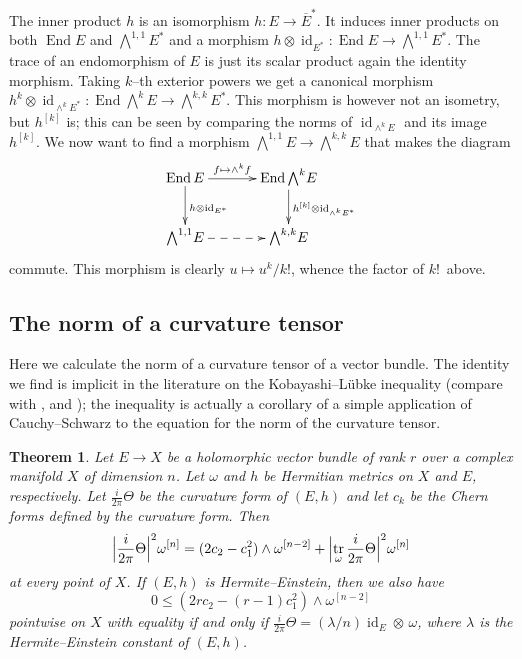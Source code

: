 \documentclass[11pt,a4paper]{amsart}
\def\^#1{^{[#1]}}
\DeclareMathOperator{\tr}{tr}
\DeclareMathOperator{\id}{id}
\DeclareMathOperator{\End}{End}
\def\curv{\frac{i}{2\pi} \Theta}
\newtheorem{theo}{Theorem}[section]
\theoremstyle{definition}
\theoremstyle{remark}
\numberwithin{equation}{section}
\begin{document}
The inner product $h$ is an isomorphism $h : E \to \overline E^*$. It
induces inner products on both $\End E$ and $\bigwedge^{1,1} \! E^*$ and a
morphism $h  \otimes \id_{E^*}: \End E \to \bigwedge^{1,1} \!
E^*$. The trace of an endomorphism of $E$ is just its scalar product
again the identity morphism.  Taking $k$--th exterior powers we get a
canonical morphism
$h^k \otimes \id_{\wedge^k E^*} : \End \bigwedge^k \! E \to
\bigwedge^{k,k} \! E^*$. This morphism is however not an isometry, but
$h\^k$ is; this can be seen by comparing the norms of $\id_{\wedge^k
E}$ and its image $h\^k$. We now want to find a morphism
$\bigwedge^{1,1} \! E \to \bigwedge^{k,k} \! E$ that makes the diagram
$$
\xymatrix@C+10pt{
    \End E \ar[r]^-{f \mapsto \wedge^k f} \ar[d]^{h \otimes \id_{E^*}} & 
    \End \bigwedge^{k} \! E \ar[d]^{h\^k \otimes \id_{\wedge^k E^*}} \\
    \bigwedge^{1,1} \! E \ar@{-->}[r] 
    & \bigwedge^{k,k} \! E
}
$$
commute. This morphism is clearly $u \mapsto u^k / k!$, whence the factor
of $k!$~above.%



\subsection*{The norm of a curvature tensor}

Here we calculate the norm of a curvature tensor of a vector
bundle. The identity we find is implicit in the literature on the
Kobayashi--L\"{u}bke inequality (compare with \cite{Chen-Ogiue},
\cite{Lubke} and \cite{Siu}); the inequality is actually a corollary of a
simple application of Cauchy--Schwarz to the equation for the norm of the
curvature tensor.

\begin{theo}
    Let $E \to X$ be a holomorphic vector bundle of rank $r$ over a complex
manifold $X$ of dimension $n$. Let $\omega$ and $h$ be Hermitian metrics on
$X$ and $E$, respectively. Let $\curv$ be the curvature form of $(E,h)$
and let $c_k$ be the Chern forms defined by the curvature form. Then
$$
\Bigl\lvert \curv \Bigr\rvert^2 \omega\^n
= (2 c_2 - c_1^2) \wedge \omega\^{n-2}
+ \Bigl\lvert \tr_\omega \curv \Bigr\rvert^2 \omega\^n
$$
at every point of $X$. If $(E,h)$ is Hermite--Einstein, then we also have
$$
0 \leq 
(2r c_2 - (r-1) c_1^2) \wedge \omega\^{n-2}
$$
pointwise on $X$ with equality if and only if $\curv = (\lambda/n) \id_E
\otimes\, \omega$, where $\lambda$ is the Hermite--Einstein constant of
$(E,h)$.
\end{theo}
\end{document}
